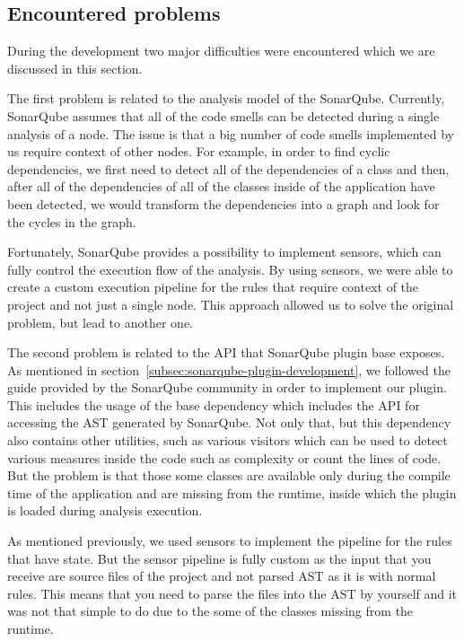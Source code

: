 \subsection{Encountered problems}\label{subsec:encountered-problems}


During the development two major difficulties were encountered which we are discussed in this section.

The first problem is related to the analysis model of the SonarQube.
Currently, SonarQube assumes that all of the code smells can be detected during a single
analysis of a node.
The issue is that a big number of code smells implemented by us require context of other nodes.
For example, in order to find cyclic dependencies, we first need to detect all of the dependencies
of a class and then, after all of the dependencies of all of the classes inside of the application have been detected,
we would transform the dependencies into a graph and look for the cycles in the graph.

Fortunately, SonarQube provides a possibility to implement sensors, which can fully control the execution flow
of the analysis.
By using sensors, we were able to create a custom execution pipeline for the rules that require context of the project
and not just a single node.
This approach allowed us to solve the original problem, but lead to another one.

The second problem is related to the API that SonarQube plugin base exposes.
As mentioned in section~\ref{subsec:sonarqube-plugin-development}, we followed the guide provided by the SonarQube community in
order to implement our plugin.
This includes the usage of the base dependency which includes the API for accessing the AST generated by SonarQube.
Not only that, but this dependency also contains other utilities, such as various visitors which can be used to detect
various measures inside the code such as complexity or count the lines of code.
But the problem is that those some classes are available only during the compile time of the application and
are missing from the runtime, inside which the plugin is loaded during analysis execution.

As mentioned previously, we used sensors to implement the pipeline for the rules that have state.
But the sensor pipeline is fully custom as the input that you receive are source files of the project and not
parsed AST as it is with normal rules.
This means that you need to parse the files into the AST by yourself and it was not that simple to do due to the some
of the classes missing from the runtime.

